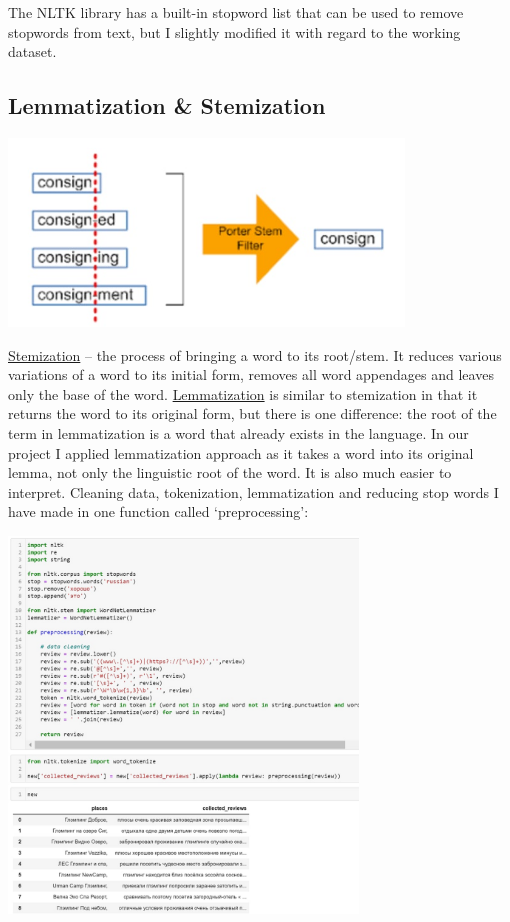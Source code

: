 \documentclass{article}
\begin{document}
The NLTK library has a built-in stopword list that can be used to remove stopwords from text, but I slightly modified it with regard to the working dataset.

\subsection{Lemmatization \& Stemization}
\setcounter{section}{9}

\begin{flushright}
\includegraphics[width=0.5\linewidth, height=5cm]{images/figure 7.jpg}
\end{flushright}
\newline
\underline{Stemization} -- the process of bringing a word to its root/stem. It reduces various variations of a word to its initial form, removes all word appendages and leaves only the base of the word.
\newline
\underline{Lemmatization} is similar to stemization in that it returns the word to its original form, but there is one difference: the root of the term in lemmatization is a word that already exists in the language.
\newline
In our project I applied lemmatization approach as it takes a word into its original lemma, not only the linguistic root of the word. It is also much easier to interpret.
\newline
Cleaning data, tokenization, lemmatization and reducing stop words I have made in one function called ‘preprocessing’:

\begin{center}
\includegraphics[width=1\linewidth, height=10cm, center]{images/figure 8.jpg}
\end{center}
\end{document}
